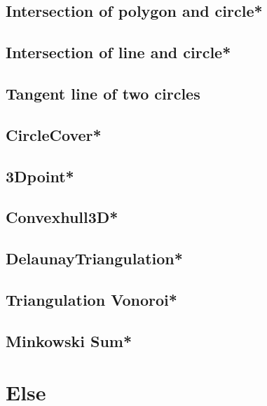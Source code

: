 \subsection{Intersection of polygon and circle*} %

\subsection{Intersection of line and circle*} %

\subsection{Tangent line of two circles}

\subsection{CircleCover*} %

\subsection{3Dpoint*} %

\subsection{Convexhull3D*} %

\subsection{DelaunayTriangulation*} %

\subsection{Triangulation Vonoroi*} %

\subsection{Minkowski Sum*} %


\section{Else}
